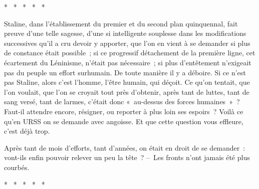 \documentclass[french,twoside]{book} %
\begin{document}
\begin{center}
\noindent \centerline{*  *  *  *  *}\par
\end{center}

\noindent Staline, dans l’établissement du premier et du second plan quinquennal, fait preuve d’une telle sagesse, d’une si intelligente souplesse dans les modifications successives qu’il a cru devoir y apporter, que l’on en vient à se demander si plus de constance était possible ; si ce progressif détachement de la première ligne, cet écartement du Léninisme, n’était pas nécessaire ; si plus d’entêtement n’exigeait pas du peuple un effort surhumain. De toute manière il y a déboire. Si ce n’est pas Staline, alors c’est l’homme, l’être humain, qui déçoit. Ce qu’on tentait, que l’on voulait, que l’on se croyait tout près d’obtenir, après tant de luttes, tant de sang versé, tant de larmes, c’était donc « au-dessus des forces humaines » ? Faut-il attendre encore, résigner, ou reporter à plus loin ses espoirs ? Voilà ce qu’en URSS on se demande avec angoisse. Et que cette question vous effleure, c’est déjà trop.\par
Après tant de mois d’efforts, tant d’années, on était en droit de se demander : vont-ils enfin pouvoir relever un peu la tête ? – Les fronts n’ont jamais été plus courbés.\par

\begin{center}
\noindent \centerline{*  *  *  *  *}\par
\end{center}
\end{document}
